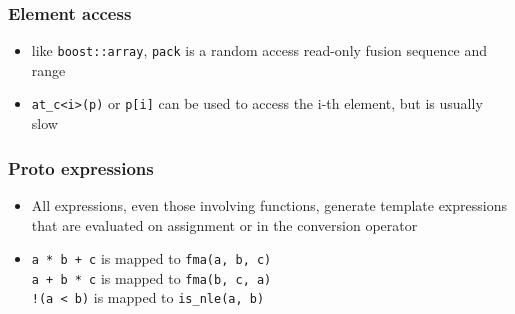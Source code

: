 \documentclass{beamer}
\begin{document}
\begin{frame}
	\frametitle{Element access}
	
	\begin{itemize}
		\item like \lstinline{boost::array}, \lstinline{pack} is a random access read-only fusion sequence and range
		\item \lstinline{at_c<i>(p)} or \lstinline{p[i]} can be used to access the i-th element, but is usually slow
	\end{itemize}
	
\end{frame}

\begin{frame}
	\frametitle{Proto expressions}
	
	\begin{itemize}
		\item All expressions, even those involving functions,
		      generate template expressions that are evaluated on assignment
		      or in the conversion operator
		\item \lstinline{a * b + c} is mapped to \lstinline{fma(a, b, c)}\\
		      \lstinline{a + b * c} is mapped to \lstinline{fma(b, c, a)}\\
		      \lstinline{!(a < b)} is mapped to \lstinline{is_nle(a, b)}
	\end{itemize}
	
\end{frame}
\end{document}
